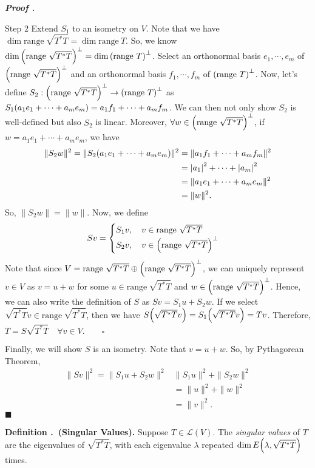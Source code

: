 \documentclass[11pt, letterpaper]{article}
\newcounter{index}[subsection]
\newenvironment*{df}[1]{\par\noindent\textbf{Definition \thesubsection.\stepcounter{index}\theindex\ (#1).}}{\par}
\newcounter{nprf}[subsection]
\newenvironment*{prf}{\par\indent\textbf{\textit{Proof \stepcounter{nprf}\thenprf.}}}{\hfill$\blacksquare$\par}
\def\L{\mathcal{L}}
\def\pqde{\qquad\square}
\def\range{\mathrm{range\ }}
\begin{document}
\begin{prf}
	\par $\boxed{\text{Step }2}$ Extend $S_1$ to an isometry on $V$. Note that we have $\dim\range\sqrt{T^*T}=\dim\range T$. So, we know $\dim\qty(\range\sqrt{T^*T})^\perp=\dim\qty(\range T)^\perp$. Select an orthonormal basis $e_1,\cdots,e_m$ of $\qty(\range\sqrt{T^*T})^\perp$ and an orthonormal basis $f_1,\cdots,f_m$ of $\qty(\range T)^\perp$. Now, let's define $S_2:\qty(\range\sqrt{T^*T})^\perp\to\qty(\range T)^\perp$ as $S_1\qty(a_1e_1+\cdots+a_me_m)=a_1f_1+\cdots+a_mf_m$. We can then not only show $S_2$ is well-defined but also $S_2$ is linear. Moreover, $\forall w\in\qty(\range\sqrt{T^*T})^\perp$, if $w=a_1e_1+\cdots+a_me_m$, we have \[\begin{aligned}\|S_2w\|^2=\|S_2\qty(a_1e_1+\cdots+a_me_m)\|^2&=\|a_1f_1+\cdots+a_mf_m\|^2\\&=\qty|a_1|^2+\cdots+\qty|a_m|^2\\&=\|a_1e_1+\cdots+a_me_m\|^2\\&=\|w\|^2.\end{aligned}\] So, $\|S_2w\|=\|w\|$. Now, we define \[Sv=\begin{cases}S_1v,\quad v\in\range\sqrt{T^*T}\\S_2v,\quad v\in\qty(\range\sqrt{T^*T})^\perp\end{cases}\] Note that since $V=\range\sqrt{T^*T}\oplus\qty(\range\sqrt{T^*T})^\perp$, we can uniquely represent $v\in V$ as $v=u+w$ for some $u\in\range\sqrt{T^*T}$ and $w\in\qty(\range\sqrt{T^*T})^\perp$. Hence, we can also write the definition of $S$ as $Sv=S_1u+S_2w$. If we select $\sqrt{T^*T}v\in\range\sqrt{T^*T}$, then we have $S\qty(\sqrt{T^*T}v)=S_1\qty(\sqrt{T^*T}v)=Tv$. Therefore, $T=S\sqrt{T^*T}\quad\forall v\in V.\pqde$
	\par Finally, we will show $S$ is an isometry. Note that $v=u+w$. So, by Pythagorean Theorem, \[\begin{aligned}\|Sv\|^2=\|S_1u+S_2w\|^2&\|S_1u\|^2+\|S_2w\|^2\\&=\|u\|^2+\|w\|^2\\&=\|v\|^2.\end{aligned}\]
\end{prf}
\begin{df}{Singular Values}
	Suppose $T\in\L(V)$. The \textit{singular values} of $T$ are the eigenvalues of $\sqrt{T^*T}$, with each eigenvalue $\lambda$ repeated $\dim E\qty(\lambda,\sqrt{T^*T})$ times. 	
\end{df}
\end{document}
